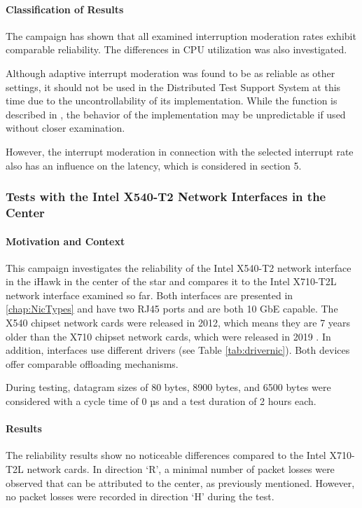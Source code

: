 \paragraph{Classification of Results}
The campaign has shown that all examined interruption moderation rates exhibit comparable reliability. The differences in CPU utilization was also investigated.

Although adaptive interrupt moderation was found to be as reliable as other settings, it should not be used in the Distributed Test Support System at this time due to the uncontrollability of its implementation. While the function is described in \cite{intermod04}, the behavior of the implementation may be unpredictable if used without closer examination.

However, the interrupt moderation in connection with the selected interrupt rate also has an influence on the latency, which is considered in section 5. %

\subsubsection{Tests with the Intel X540-T2 Network Interfaces in the Center} \label{chap:IntelRel540}
\paragraph{Motivation and Context}
This campaign investigates the reliability of the Intel X540-T2 network interface in the iHawk in the center of the star and compares it to the Intel X710-T2L network interface examined so far. Both interfaces are presented in \ref{chap:NicTypes} and have two RJ45 ports and are both 10 GbE capable. The X540 chipset network cards were released in 2012, which means they are 7 years older than the X710 chipset network cards, which were released in 2019 \cite{setupnw02, setupnw03}. In addition, interfaces use different drivers (see Table \ref{tab:drivernic}). Both devices offer comparable offloading mechanisms.

During testing, datagram sizes of 80 bytes, 8900 bytes, and 6500 bytes were considered with a cycle time of 0 µs and a test duration of 2 hours each.

\paragraph{Results}
The reliability results show no noticeable differences compared to the Intel X710-T2L network cards. In direction `R', a minimal number of packet losses were observed that can be attributed to the center, as previously mentioned. However, no packet losses were recorded in direction `H' during the test.


